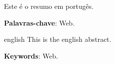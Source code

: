 
\begin{resumo}
	Este é o resumo em portugês.

	\vspace{\onelineskip}

	\noindent
	\textbf{Palavras-chave}: Web.
\end{resumo}

\begin{resumo}[Abstract]
	\begin{otherlanguage*}{english}
		This is the english abstract.

		\vspace{\onelineskip}

		\noindent
		\textbf{Keywords}: Web.
	\end{otherlanguage*}
\end{resumo}
